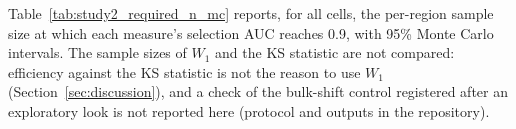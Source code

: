 \documentclass[AMA,Times1COL]{WileyNJDv5}
\begin{document}
Table~\ref{tab:study2_required_n_mc} reports, for all  cells, the per-region sample size at which each measure's selection AUC reaches 0.9, with 95\% Monte Carlo intervals. The sample sizes of $W_1$ and the KS statistic are not compared: efficiency against the KS statistic is not the reason to use $W_1$ (Section~\ref{sec:discussion}), and a check of the bulk-shift control registered after an exploratory look is not reported here (protocol and outputs in the repository).
\end{document}
